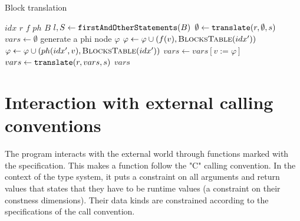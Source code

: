 \begin{algorithm}
    \caption{Block translation}
    \label{transl_block}
    \begin{algorithmic}[1]
        \Require $idx$ 
        \Require $r$ 
        \Require $f$ 
        \Require $ph$ 
        \Require $B$ 
        \State $l, S \gets \mathtt{firstAndOtherStatements}(B)$
        \State $\emptyset \gets \mathtt{translate}(r, \emptyset, s)$ 
        \State $vars \gets \emptyset$ 
            \State generate a phi node $\varphi$
                    \State $\varphi \gets \varphi \cup (f(v), \text{\textsc{BlocksTable}}(idx'))$
                \Else
                    \State $\varphi \gets \varphi \cup (ph(idx', v), \text{\textsc{BlocksTable}}(idx'))$
                \EndIf {}
            \EndFor
            \State $vars \gets vars[v := \varphi]$ 
        \EndFor
            \State $vars \gets \mathtt{translate} (r, vars, s)$ 
        \EndFor
        \State \Return $vars$
    \end{algorithmic}
\end{algorithm}


\section{Interaction with external calling conventions}

The program interacts with the external world through functions marked with the  specification. This makes a function follow the "C" calling convention. In the context of the type system, it puts a constraint on all arguments and return values that states that they have to be runtime values (a constraint on their constness dimensions). Their data kinds are constrained according to the specifications of the call convention.
